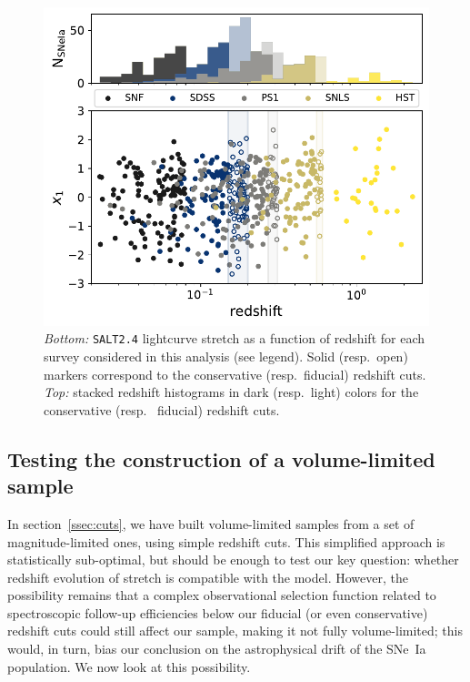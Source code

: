 \documentclass[]{aa}
\begin{document}
\begin{figure}
    \centering
    \includegraphics[width=0.95\linewidth]{Article_figures/stretchs-cut_btw_hist_stac_75-lb-cividis.pdf}
    \caption{\textit{Bottom:} \textsc{\texttt{SALT2.4}} lightcurve stretch as a
        function of redshift for each survey considered in this analysis (see
        legend). Solid (resp.\ open) markers correspond to the conservative
        (resp.\ fiducial) redshift cuts. \textit{Top:} stacked redshift
    histograms in dark (resp.\ light) colors for the conservative (resp. \
fiducial) redshift cuts.}
    \label{fig:sample}
\end{figure}

\subsection{Testing the construction of a volume-limited sample}\label{ssec:verify}

In section~\ref{ssec:cuts}, we have built volume-limited samples from a set of
magnitude-limited ones, using simple redshift cuts. This simplified approach is
statistically sub-optimal, but should be enough to test our key question:
whether redshift evolution of stretch is compatible with the \cite{rigault2020}
model. However, the possibility remains that a complex observational selection
function related to spectroscopic follow-up efficiencies below our fiducial (or
even conservative) redshift cuts could still affect our sample, making it not
fully volume-limited; this would, in turn, bias our conclusion on the
astrophysical drift of the SNe~Ia population. We now look at this possibility.
\end{document}
